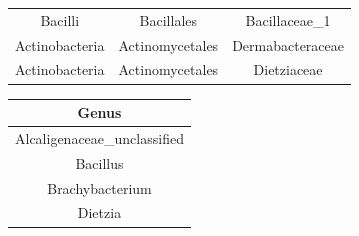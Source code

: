 \documentclass[]{article}
\begin{document}
\begin{longtable}[]{@{}ccc@{}}
\begin{minipage}[t]{0.27\columnwidth}
Bacilli\strut
\end{minipage} & \begin{minipage}[t]{0.23\columnwidth}\centering\strut
Bacillales\strut
\end{minipage} & \begin{minipage}[t]{0.23\columnwidth}\centering\strut
Bacillaceae\_1\strut
\end{minipage}\tabularnewline
\begin{minipage}[t]{0.27\columnwidth}\centering\strut
Actinobacteria\strut
\end{minipage} & \begin{minipage}[t]{0.23\columnwidth}\centering\strut
Actinomycetales\strut
\end{minipage} & \begin{minipage}[t]{0.23\columnwidth}\centering\strut
Dermabacteraceae\strut
\end{minipage}\tabularnewline
\begin{minipage}[t]{0.27\columnwidth}\centering\strut
Actinobacteria\strut
\end{minipage} & \begin{minipage}[t]{0.23\columnwidth}\centering\strut
Actinomycetales\strut
\end{minipage} & \begin{minipage}[t]{0.23\columnwidth}\centering\strut
Dietziaceae\strut
\end{minipage}\tabularnewline
\bottomrule
\end{longtable}

\begin{longtable}[]{@{}c@{}}
\toprule
\begin{minipage}[b]{0.39\columnwidth}\centering\strut
Genus\strut
\end{minipage}\tabularnewline
\midrule
\endhead
\begin{minipage}[t]{0.39\columnwidth}\centering\strut
Alcaligenaceae\_unclassified\strut
\end{minipage}\tabularnewline
\begin{minipage}[t]{0.39\columnwidth}\centering\strut
Bacillus\strut
\end{minipage}\tabularnewline
\begin{minipage}[t]{0.39\columnwidth}\centering\strut
Brachybacterium\strut
\end{minipage}\tabularnewline
\begin{minipage}[t]{0.39\columnwidth}\centering\strut
Dietzia\strut
\end{minipage}\tabularnewline
\bottomrule
\end{longtable}
\end{document}
